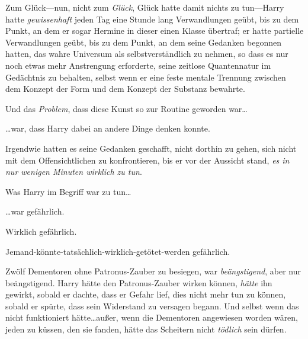 Zum Glück—nun, nicht zum \emph{Glück}, Glück hatte damit nichts zu tun—Harry hatte \emph{gewissenhaft} jeden Tag eine Stunde lang Verwandlungen geübt, bis zu dem Punkt, an dem er sogar Hermine in dieser einen Klasse übertraf; er hatte partielle Verwandlungen geübt, bis zu dem Punkt, an dem seine Gedanken begonnen hatten, das wahre Universum als selbstverständlich zu nehmen, so dass es nur noch etwas mehr Anstrengung erforderte, seine zeitlose Quantennatur im Gedächtnis zu behalten, selbst wenn er eine feste mentale Trennung zwischen dem Konzept der Form und dem Konzept der Substanz bewahrte.

Und das \emph{Problem}, dass diese Kunst so zur Routine geworden war…

…war, dass Harry dabei an andere Dinge denken konnte.

Irgendwie hatten es seine Gedanken geschafft, nicht dorthin zu gehen, sich nicht mit dem Offensichtlichen zu konfrontieren, bis er vor der Aussicht stand, \emph{es in nur wenigen Minuten wirklich zu tun}.

Was Harry im Begriff war zu tun…

…war gefährlich.

Wirklich gefährlich.

Jemand-könnte-tatsächlich-wirklich-getötet-werden gefährlich.

Zwölf Dementoren ohne Patronus-Zauber zu besiegen, war \emph{beängstigend}, aber nur beängstigend. Harry hätte den Patronus-Zauber wirken können, \emph{hätte} ihn gewirkt, sobald er dachte, dass er Gefahr lief, dies nicht mehr tun zu können, sobald er spürte, dass sein Widerstand zu versagen begann. Und selbst wenn das nicht funktioniert hätte…außer, wenn die Dementoren angewiesen worden wären, jeden zu küssen, den sie fanden, hätte das Scheitern nicht \emph{tödlich} sein dürfen.

